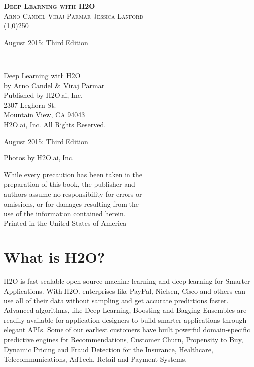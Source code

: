 \documentclass{article}[11pt]
\begin{document}
\thispagestyle{empty} %

\begin{center}
\textsc{\Large\bf{Deep Learning with H2O}}
\\
\bigskip
\textsc{\small{Arno Candel \hspace{40pt} Viraj Parmar \hspace{40pt} Jessica Lanford}}
\\
\bigskip
\line(1,0){250}  %

\bigskip
August 2015: Third Edition 
\\%
\bigskip
\end{center}

{\raggedright\vfill\ 

Deep Learning with H2O\\
  by Arno Candel \&\ Viraj Parmar\\
\bigskip
  Published by H2O.ai, Inc. \\
2307 Leghorn St. \\
Mountain View, CA 94043\\
\bigskip
{} H2O.ai, Inc. All Rights Reserved. 
\bigskip

August 2015: Third Edition
\bigskip

Photos by \textcopyright H2O.ai, Inc. 
\bigskip

While every precaution has been taken in the\\
preparation of this book, the publisher and\\
authors assume no responsibility for errors or\\
omissions, or for damages resulting from the\\
use of the information contained herein.\\
\bigskip
Printed in the United States of America. 


}\par

\newpage
\tableofcontents

\newpage
\section{What is H2O?}

H2O is fast scalable open-source machine learning and deep learning for Smarter Applications. With H2O, enterprises like PayPal, Nielsen, Cisco and others can use all of their data without sampling and get accurate predictions faster. Advanced algorithms, like Deep Learning, Boosting and Bagging Ensembles are readily available for application designers to build smarter applications through elegant APIs. Some of our earliest customers have built powerful domain-specific predictive engines for Recommendations, Customer Churn, Propensity to Buy, Dynamic Pricing and Fraud Detection for the Insurance, Healthcare, Telecommunications, AdTech,
Retail and Payment Systems.
\end{document}
